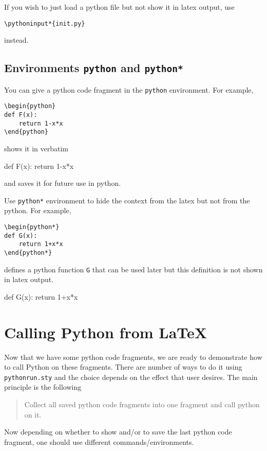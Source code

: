 \documentclass[a4paper,12pt]{article}
\begin{document}
If you wish to just load a python file but not show it in latex
output, use
\begin{verbatim}
\pythoninput*{init.py}
\end{verbatim}
instead.
\pythonreset           %
                       
\subsection{Environments \texttt{python} and \texttt{python*}}

You can give a python code fragment in the \verb+python+ environment. For example,
\begin{verbatim}
\begin{python}
def F(x):
    return 1-x*x
\end{python}
\end{verbatim}
shows it in verbatim
\begin{python}
def F(x):
    return 1-x*x
\end{python}
and saves it for future use in python. 

Use \verb+python*+ environment to hide the context from the latex but
not from the python. For example, 
\begin{verbatim}
\begin{python*}
def G(x):
    return 1+x*x
\end{python*}
\end{verbatim}
defines a python function \verb+G+ that can be used later but this
definition is not shown in latex output.
\begin{python*}
def G(x):
    return 1+x*x
\end{python*}


\section{Calling Python from LaTeX}

Now that we have some python code fragments, we are ready to
demonstrate how to call Python on these fragments. There are number of
ways to do it using \verb+pythonrun.sty+ and the choice depends on the
effect that user desires.
The main principle is the following
\begin{quotation}
Collect all saved python code fragments into one fragment and
  call python on it.
\end{quotation}
Now depending on whether to show and/or to save the last python code
fragment, one should use different commands/environments.
\end{document}
